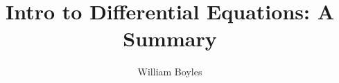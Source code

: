 


	\title{Intro to Differential Equations: A Summary}
	\author{William Boyles}
	\date{}
		
	\frontmatter
		\maketitle
		\tableofcontents
	
	\mainmatter
		
	\appendix
		
	\backmatter


